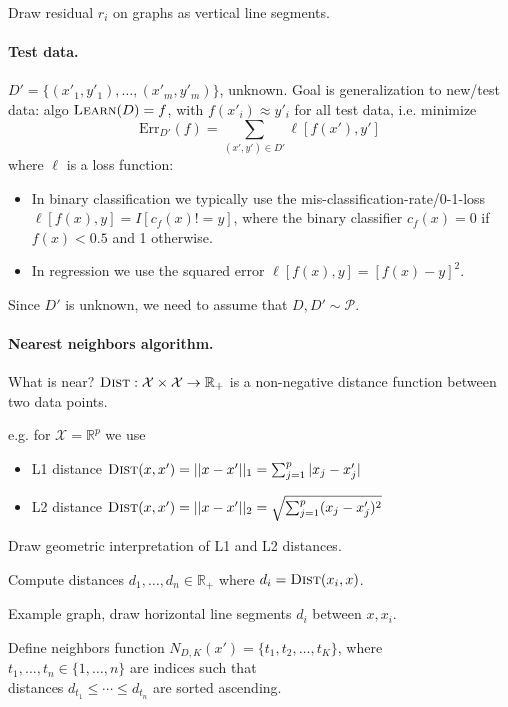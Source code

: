 \documentclass{article}
\begin{document}
Draw residual $r_i$ on graphs as vertical line segments.

\paragraph{Test data.} $D'= \{ (x'_1,y'_1), \dots, (x'_m,y'_m)\}$, unknown.
Goal is generalization to new/test data: algo $\textsc{Learn}(D) = f$,
with $f(x'_i)\approx y'_i$ for all test data, i.e. minimize
\begin{equation}
  \text{Err}_{D'}(f) = \sum_{(x',y')\in D'} \ell[f(x'), y']
\end{equation}
where $\ell$ is a loss function:
\begin{itemize}
\item In binary classification we typically use the
  mis-classification-rate/0-1-loss $\ell[f(x),y]=I[c_f(x)!=y]$, where
  the binary classifier $c_f(x)=0$ if $f(x)<0.5$ and 1 otherwise.
\item In regression we use the squared error $\ell[f(x),y]=[f(x)-y]^2$.
\end{itemize}
Since $D'$ is unknown, we need to assume that $D,D'\sim \mathcal P$.

\paragraph{Nearest neighbors algorithm.} What is near?
$\textsc{Dist}:\mathcal X\times \mathcal X \rightarrow \mathbb R_+$ is
a non-negative distance function between two data points.

e.g. for $\mathcal X=\mathbb R^p$ we use
\begin{itemize}
\item L1 distance $\textsc{Dist}(x,x') = ||x-x'||_1 = \sum_{j=1}^p |x_j-x_j'|$
\item L2 distance $\textsc{Dist}(x,x') = ||x-x'||_2 = \sqrt{
\sum_{j=1}^p (x_j-x_j')^2}$
\end{itemize}
Draw geometric interpretation of L1 and L2 distances.

Compute distances $d_1,\dots,d_n\in\mathbb R_+$ where 
$d_i=\textsc{Dist}(x_i,x)$.

Example graph, draw horizontal line segments $d_i$ between $x,x_i$.

Define neighbors function $N_{D,K}(x') = \{t_1, t_2, \dots, t_K\}$, where\\
$t_1,\dots,t_n\in\{1,\dots,n\}$ are indices such that\\
distances $d_{t_1}\leq \cdots \leq d_{t_n}$ are sorted ascending.
\end{document}
